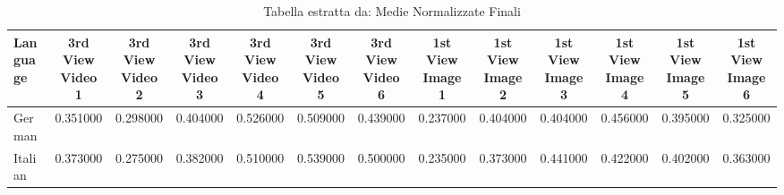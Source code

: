 \begin{table}[htbp]
\caption{Tabella estratta da: Medie Normalizzate Finali}
\label{tab:medie_normalizzate_finali}
\begin{tabular}{lcccccccccccc}
\toprule
Language & 3rd View Video 1 & 3rd View Video 2 & 3rd View Video 3 & 3rd View Video 4 & 3rd View Video 5 & 3rd View Video 6 & 1st View Image 1 & 1st View Image 2 & 1st View Image 3 & 1st View Image 4 & 1st View Image 5 & 1st View Image 6 \\
\midrule
German & 0.351000 & 0.298000 & 0.404000 & 0.526000 & 0.509000 & 0.439000 & 0.237000 & 0.404000 & 0.404000 & 0.456000 & 0.395000 & 0.325000 \\
Italian & 0.373000 & 0.275000 & 0.382000 & 0.510000 & 0.539000 & 0.500000 & 0.235000 & 0.373000 & 0.441000 & 0.422000 & 0.402000 & 0.363000 \\
\bottomrule
\end{tabular}
\end{table}
